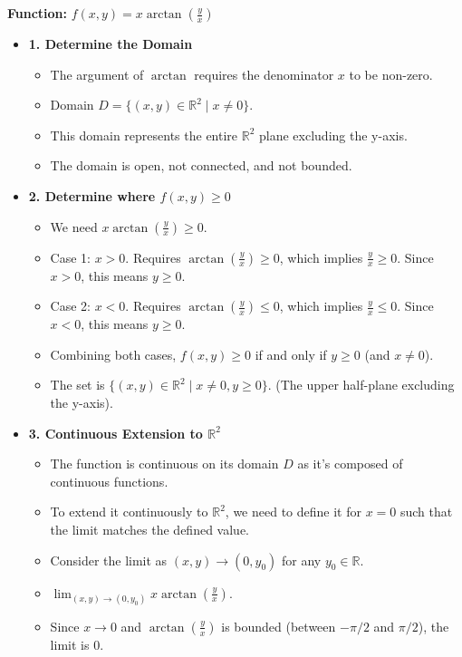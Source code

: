 \begin{cascade}
	\textbf{Function:} $f(x,y) = x \arctan\left(\frac{y}{x}\right)$
	\begin{itemize}
		\item \textbf{1. Determine the Domain}
		      \begin{itemize}
			      \item The argument of $\arctan$ requires the denominator $x$ to be non-zero.
			      \item Domain $D = \{(x,y) \in \mathbb{R}^2 \mid x \neq 0\}$.
			      \item This domain represents the entire $\mathbb{R}^2$ plane excluding the y-axis.
			      \item The domain is open, not connected, and not bounded.
		      \end{itemize}
		\item \textbf{2. Determine where $f(x,y) \ge 0$}
		      \begin{itemize}
			      \item We need $x \arctan(\frac{y}{x}) \ge 0$.
			      \item Case 1: $x > 0$. Requires $\arctan(\frac{y}{x}) \ge 0$, which implies $\frac{y}{x} \ge 0$. Since $x>0$, this means $y \ge 0$.
			      \item Case 2: $x < 0$. Requires $\arctan(\frac{y}{x}) \le 0$, which implies $\frac{y}{x} \le 0$. Since $x<0$, this means $y \ge 0$.
			      \item Combining both cases, $f(x,y) \ge 0$ if and only if $y \ge 0$ (and $x \neq 0$).
			      \item The set is $\{(x,y) \in \mathbb{R}^2 \mid x \neq 0, y \ge 0\}$. (The upper half-plane excluding the y-axis).
		      \end{itemize}
		\item \textbf{3. Continuous Extension to $\mathbb{R}^2$}
		      \begin{itemize}
			      \item The function is continuous on its domain $D$ as it's composed of continuous functions.
			      \item To extend it continuously to $\mathbb{R}^2$, we need to define it for $x=0$ such that the limit matches the defined value.
			      \item Consider the limit as $(x,y) \to (0, y_0)$ for any $y_0 \in \mathbb{R}$.
			      \item $\lim_{(x,y)\to(0, y_0)} x \arctan\left(\frac{y}{x}\right)$.
			      \item Since $x \to 0$ and $\arctan(\frac{y}{x})$ is bounded (between $-\pi/2$ and $\pi/2$), the limit is $0$.

\end{itemize}
\end{itemize}
\end{cascade}
